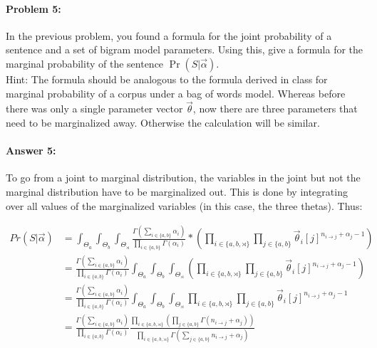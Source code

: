 \documentclass[10pt]{article}
\begin{document}
\hrulefill
\paragraph{Problem 5:}

In the previous problem, you found a formula for the joint probability
of a sentence and a set of bigram model parameters. Using this, give a
formula for the marginal probability of the sentence
$\Pr(S|\vec{\alpha})$.\\

\noindent Hint: The formula should be analogous to the formula derived
in class for marginal probability of a corpus under a bag of words
model. Whereas before there was only a single parameter vector
$\vec{\theta}$, now there are three parameters that need to be
marginalized away. Otherwise the calculation will be similar.

\paragraph{Answer 5:} To go from a joint to marginal distribution, the variables in the joint but not the marginal distribution have to be marginalized out. This is done by integrating over all values of the marginalized variables (in this case, the three thetas). Thus:

\begin{equation*}
    \begin{split}
        Pr(S | \vec{\alpha}) &= \int_{\Theta_a}\int_{\Theta_b}\int_{\Theta_\rtimes} \frac{\Gamma(\sum_{i \in \{a,b\}} \alpha_i)}{\prod_{i \in \{a,b\}}\Gamma (\alpha_i)} * (\prod_{i \in \{a,b,\rtimes\}} \prod_{j \in \{a,b\}} \vec{\theta}_{i}[j]^{n_{i \rightarrow j}+\alpha_j-1})\\
        &= \frac{\Gamma(\sum_{i \in \{a,b\}} \alpha_i)}{\prod_{i \in \{a,b\}}\Gamma (\alpha_i)}  \int_{\Theta_a}\int_{\Theta_b}\int_{\Theta_\rtimes}(\prod_{i \in \{a,b,\rtimes\}} \prod_{j \in \{a,b\}} \vec{\theta}_{i}[j]^{n_{i \rightarrow j}+\alpha_j-1})\\
        &= \frac{\Gamma(\sum_{i \in \{a,b\}} \alpha_i)}{\prod_{i \in \{a,b\}}\Gamma (\alpha_i)} \int_{\Theta_a}\int_{\Theta_b}\int_{\Theta_\rtimes} \prod_{i \in \{a,b,\rtimes\}} \prod_{j \in \{a,b\}} \vec{\theta}_{i}[j]^{n_{i \rightarrow j}+\alpha_j-1}\\
        &=\frac{\Gamma(\sum_{i \in \{a,b\}} \alpha_i)}{\prod_{i \in \{a,b\}}\Gamma (\alpha_i)} \frac{\prod_{i\in\{a,b,\rtimes\}}(\prod_{j\in\{a,b\}}\Gamma(n_{i \rightarrow j} + \alpha_{j}))}{\prod_{i \in \{a,b,\rtimes\}}\Gamma(\sum_{j \in \{a,b\}} n_{i \rightarrow j} + \alpha_{j})}
    \end{split}
\end{equation*}
\end{document}
